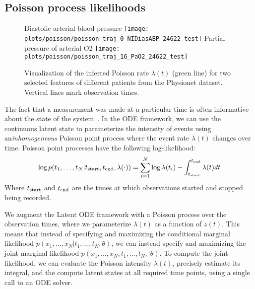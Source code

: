 \documentclass{article}
\begin{document}
\subsection{Poisson process likelihoods}

\begin{wrapfigure}[22]{r}{0.30\textwidth}
    \vspace{-6mm}
	\centering
	{\footnotesize Diastolic arterial blood pressure}
    \texttt{[image: plots/poisson/poisson\_traj\_0\_NIDiasABP\_24622\_test]}
    {\footnotesize Partial pressure of arterial O2}
     \texttt{[image: plots/poisson/poisson\_traj\_16\_PaO2\_24622\_test]}
    \caption{Visualization of the inferred Poisson rate $\lambda(t)$ (green line) for two selected features of different patients from the Physionet dataset. Vertical lines mark observation times.} 
    \label{fig:poisson}
\end{wrapfigure}
The fact that a measurement was made at a particular time is often informative about the state of the system~\citep{che_sontag_2018}.
In the ODE framework, we can use the continuous latent state to parameterize the intensity of events using an\emph{inhomogeneous} Poisson point process \citep{palm1943intensitatsschwankungen} where the event rate $\lambda(t)$ changes over time.
Poisson point processes have the following log-likelihood:
\begin{equation}
\log p(t_1, \dots, t_N | t_\textnormal{start}, t_\textnormal{end}, \lambda(\cdot)) = \sum_{i=1}^{N} \log \lambda(t_i) - \int_{t_\textnormal{start}}^{t_\textnormal{end}} \lambda(t) dt \nonumber 
\label{eq:poisson_process}
\end{equation}
Where $t_\textnormal{start}$ and $t_\textnormal{end}$ are the times at which observations started and stopped being recorded.

We augment the Latent ODE framework with a Poisson process over the observation times, where we parameterize $\lambda(t)$ as a function of $z(t)$.
This means that instead of specifying and maximizing the conditional marginal likelihood $p(x_1, \dots, x_N | t_1, \dots, t_N, \theta)$, we can instead specify and maximizing the joint marginal likelihood $p(x_1, \dots, x_N , t_1, \dots, t_N, | \theta)$.
To compute the joint likelihood, we can evaluate the Poisson intensity $\lambda(t)$, precisely estimate its integral, and the compute latent states at all required time points, using a single call to an ODE solver.
\end{document}
